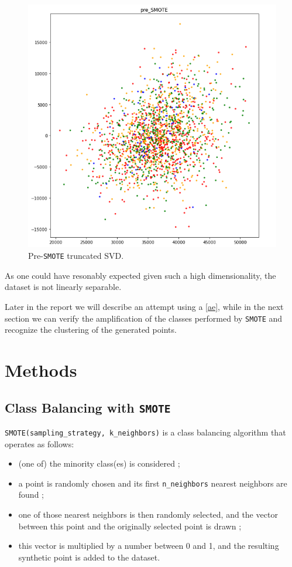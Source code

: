 \documentclass[aps,twocolumn,secnumarabic,nobalancelastpage,amsmath,amssymb,
nofootinbib]{revtex4}
\begin{document}
\begin{figure}
	\centering
	\includegraphics[width=0.7\linewidth]{Images/TruncatedSVD_preSMOTE}
	\caption{Pre-\texttt{SMOTE} truncated SVD.}
	\label{fig:pre-smote}
\end{figure}


As one could have resonably expected given such a high dimensionality,
the dataset is not linearly separable. 

Later in the report we will describe an attempt using a
\ref{ae}, while in the next section we can verify the amplification of the classes performed by \texttt{SMOTE} and recognize the clustering of the generated points.

\section{Methods}\label{methods}

\subsection{Class Balancing with
		\texttt{SMOTE}\label{smote}}

\texttt{SMOTE(sampling\_strategy,\ k\_neighbors)} is a class balancing
algorithm that operates as follows:

\begin{itemize}

\item
(one of) the minority class(es) is considered ;
\vspace{-0.2cm}\item
a point is randomly chosen and its first \texttt{n\_neighbors} nearest
neighbors are found ;
\vspace{-0.2cm}\item
one of those nearest neighbors is then randomly selected, and the
vector between this point and the originally selected point is drawn ;
\vspace{-0.2cm}\item
this vector is multiplied by a number between 0 and 1, and the
resulting synthetic point is added to the dataset.
\end{itemize}
\end{document}
